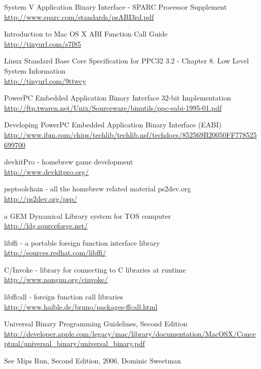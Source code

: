\begin{thebibliography}{14}
	System V Application Binary Interface - SPARC Processor Supplement\\
	\url{http://www.sparc.com/standards/psABI3rd.pdf}

	Introduction to Mac OS X ABI Function Call Guide\\
	\url{http://tinyurl.com/s7f85}

	Linux Standard Base Core Specification for PPC32 3.2 - Chapter 8. Low Level System Information\\
	\url{http://tinyurl.com/9ttwcy}

        PowerPC Embedded Application Binary Interface 32-bit Implementation\\
        \url{http://ftp.twaren.net/Unix/Sourceware/binutils/ppc-eabi-1995-01.pdf}

        Developing PowerPC Embedded Application Binary Interface (EABI)\\
        \url{http://www.ibm.com/chips/techlib/techlib.nsf/techdocs/852569B20050FF778525699700}

	devkitPro - homebrew game development\\
	\url{http://www.devkitpro.org/}

	psptoolchain - all the homebrew related material ps2dev.org\\
	\url{http://ps2dev.org/psp/}

	a GEM Dynamical Library system for TOS computer\\
	\url{http://ldg.sourceforge.net/}

	libffi - a portable foreign function interface library\\
	\url{http://sources.redhat.com/libffi/}

	C/Invoke - library for connecting to C libraries at runtime\\
	\url{http://www.nongnu.org/cinvoke/}

	libffcall - foreign function call libraries\\
	\url{http://www.haible.de/bruno/packages-ffcall.html}

        Universal Binary Programming Guidelines, Second Edition\\
        \url{http://developer.apple.com/legacy/mac/library/documentation/MacOSX/Conceptual/universal\_binary/universal\_binary.pdf}

        See Mips Run, Second Edition, 2006, Dominic Sweetman

\end{thebibliography}

